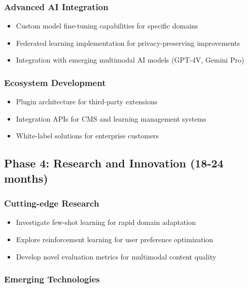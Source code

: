 \documentclass{bscs}
\begin{document}
\subsubsection{Advanced AI Integration}

\begin{itemize}
\item Custom model fine-tuning capabilities for specific domains
\item Federated learning implementation for privacy-preserving improvements
\item Integration with emerging multimodal AI models (GPT-4V, Gemini Pro)
\end{itemize}

\subsubsection{Ecosystem Development}

\begin{itemize}
\item Plugin architecture for third-party extensions
\item Integration APIs for CMS and learning management systems
\item White-label solutions for enterprise customers
\end{itemize}

\subsection{Phase 4: Research and Innovation (18-24 months)}

\subsubsection{Cutting-edge Research}

\begin{itemize}
\item Investigate few-shot learning for rapid domain adaptation
\item Explore reinforcement learning for user preference optimization
\item Develop novel evaluation metrics for multimodal content quality
\end{itemize}

\subsubsection{Emerging Technologies}
\end{document}
